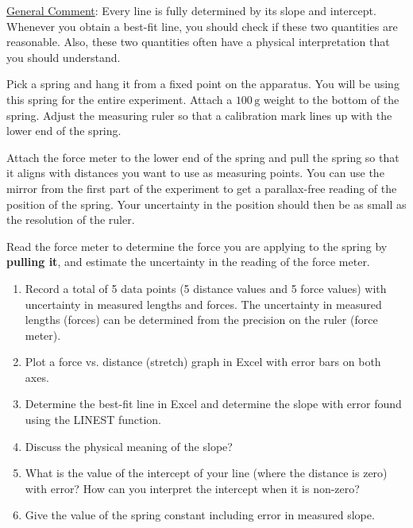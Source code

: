 \underline{General Comment}: Every line is fully determined by its slope and intercept. Whenever you obtain a best-fit line, you should check if these two quantities are reasonable. Also, these two quantities often have a physical interpretation that you should understand. \myskip

Pick a spring and hang it from a fixed point on the apparatus. You will be using this spring for the entire experiment. Attach a $100\,\mathrm{g}$ weight to the bottom of the spring. Adjust the measuring ruler so that a calibration mark lines up with the lower end of the spring. \myskip

Attach the force meter to the lower end of the spring and pull the spring so that it aligns with distances you want to use as measuring points. You can use the mirror from the first part of the experiment to get a parallax-free reading of the position of the spring. Your uncertainty in the position should then be as small as the resolution of the ruler. \myskip

Read the force meter to determine the force you are applying to the spring by {\bf{pulling it}}, and estimate the uncertainty in the reading of the force meter.

\begin{enumerate}
    \item Record a total of 5 data points (5 distance values and 5 force values) with uncertainty in measured lengths and forces. The uncertainty in measured lengths (forces) can be determined from the precision on the ruler (force meter).
    \item Plot a force vs. distance (stretch) graph in Excel with error bars on both axes.
    \item Determine the best-fit line in Excel and determine the slope with error found using the LINEST function.
    \item Discuss the physical meaning of the slope?
    \item What is the value of the intercept of your line (where the distance is zero) with error?  How can you interpret the intercept when it is non-zero?
    \item Give the value of the spring constant including error in measured slope.
\end{enumerate}

